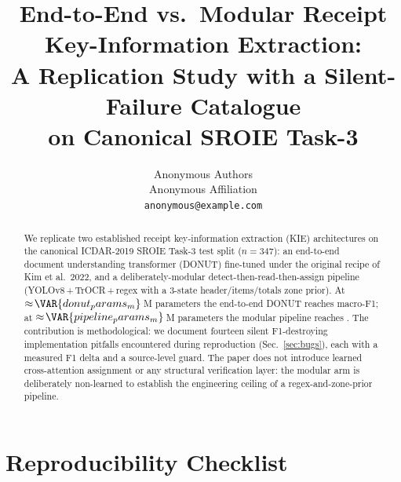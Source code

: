 \documentclass[conference]{IEEEtran}
\title{End-to-End vs.\ Modular Receipt Key-Information Extraction:\\
       A Replication Study with a Silent-Failure Catalogue\\
       on Canonical SROIE Task-3}
\author{Anonymous Authors\\Anonymous Affiliation\\
        \texttt{anonymous@example.com}}
\begin{document}
\maketitle

\begin{abstract}
We replicate two established receipt key-information extraction (KIE)
architectures on the canonical ICDAR-2019 SROIE Task-3 test split
($n=347$): an end-to-end document understanding transformer (DONUT)
fine-tuned under the original recipe of Kim et al.\ 2022, and a
deliberately-modular detect-then-read-then-assign pipeline
(YOLOv8\,+\,TrOCR\,+\,regex with a 3-state header/items/totals zone
prior).  At $\approx\!\VAR{donut_params_m}$\,M parameters the
end-to-end DONUT reaches  macro-F1; at
$\approx\!\VAR{pipeline_params_m}$\,M parameters the modular pipeline
reaches .  The contribution is methodological: we
document fourteen silent F1-destroying implementation pitfalls
encountered during reproduction (Sec.~\ref{sec:bugs}), each with a
measured F1 delta and a source-level guard.  The paper does not
introduce learned cross-attention assignment or any structural
verification layer: the modular arm is deliberately non-learned to
establish the engineering ceiling of a regex-and-zone-prior pipeline.
\end{abstract}




























\section*{Reproducibility Checklist}
\label{sec:repro_checklist}

\end{document}
